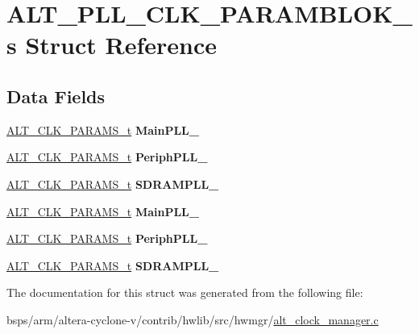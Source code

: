 \hypertarget{structALT__PLL__CLK__PARAMBLOK__s}{}\section{A\+L\+T\+\_\+\+P\+L\+L\+\_\+\+C\+L\+K\+\_\+\+P\+A\+R\+A\+M\+B\+L\+O\+K\+\_\+s Struct Reference}
\label{structALT__PLL__CLK__PARAMBLOK__s}
\subsection*{Data Fields}
\begin{DoxyCompactItemize}
\item 
\mbox{\label{structALT__PLL__CLK__PARAMBLOK__s_a23066c35615cfafa0d168020265a4f11}} 
\mbox{\hyperlink{structALT__CLK__PARAMS__s}{A\+L\+T\+\_\+\+C\+L\+K\+\_\+\+P\+A\+R\+A\+M\+S\+\_\+t}} {\bfseries Main\+P\+L\+L\+\_}
\item 
\mbox{\label{structALT__PLL__CLK__PARAMBLOK__s_ae942ded018661a964ae688a229e9c0e3}} 
\mbox{\hyperlink{structALT__CLK__PARAMS__s}{A\+L\+T\+\_\+\+C\+L\+K\+\_\+\+P\+A\+R\+A\+M\+S\+\_\+t}} {\bfseries Periph\+P\+L\+L\+\_}
\item 
\mbox{\label{structALT__PLL__CLK__PARAMBLOK__s_a906d7977a45f4b8c392b6502bc995b85}} 
\mbox{\hyperlink{structALT__CLK__PARAMS__s}{A\+L\+T\+\_\+\+C\+L\+K\+\_\+\+P\+A\+R\+A\+M\+S\+\_\+t}} {\bfseries S\+D\+R\+A\+M\+P\+L\+L\+\_}
\item 
\mbox{\label{structALT__PLL__CLK__PARAMBLOK__s_aeb683ec921a02ea7022af5d488abc868}} 
\mbox{\hyperlink{structALT__CLK__PARAMS__s}{A\+L\+T\+\_\+\+C\+L\+K\+\_\+\+P\+A\+R\+A\+M\+S\+\_\+t}} {\bfseries Main\+P\+L\+L\+\_}
\item 
\mbox{\label{structALT__PLL__CLK__PARAMBLOK__s_ae4da2c0cab242480ed247ce5b10c1cfe}} 
\mbox{\hyperlink{structALT__CLK__PARAMS__s}{A\+L\+T\+\_\+\+C\+L\+K\+\_\+\+P\+A\+R\+A\+M\+S\+\_\+t}} {\bfseries Periph\+P\+L\+L\+\_}
\item 
\mbox{\label{structALT__PLL__CLK__PARAMBLOK__s_a867fa5d8cec121d45e09b720a561f3c9}} 
\mbox{\hyperlink{structALT__CLK__PARAMS__s}{A\+L\+T\+\_\+\+C\+L\+K\+\_\+\+P\+A\+R\+A\+M\+S\+\_\+t}} {\bfseries S\+D\+R\+A\+M\+P\+L\+L\+\_}
\end{DoxyCompactItemize}


The documentation for this struct was generated from the following file\+:\begin{DoxyCompactItemize}
\item 
bsps/arm/altera-\/cyclone-\/v/contrib/hwlib/src/hwmgr/\mbox{\hyperlink{alt__clock__manager_8c}{alt\+\_\+clock\+\_\+manager.\+c}}\end{DoxyCompactItemize}
